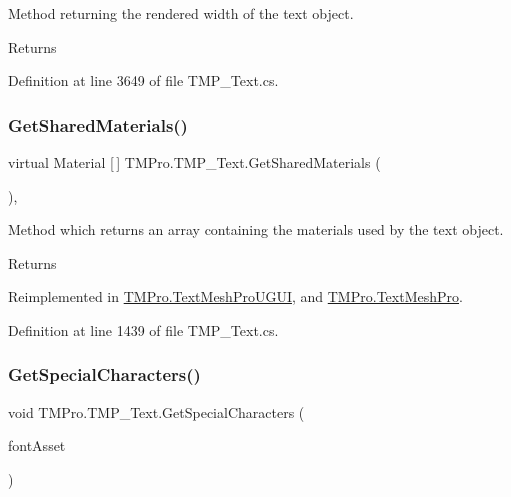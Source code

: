 Method returning the rendered width of the text object. 

\begin{DoxyReturn}{Returns}

\end{DoxyReturn}


Definition at line 3649 of file T\+M\+P\+\_\+\+Text.\+cs.

\mbox{\label{class_t_m_pro_1_1_t_m_p___text_a187cdc5ab36e0006fa0516f208a3cffd}} 
\subsubsection{\texorpdfstring{GetSharedMaterials()}{GetSharedMaterials()}}
{\footnotesize\ttfamily virtual Material \mbox{[}$\,$\mbox{]} T\+M\+Pro.\+T\+M\+P\+\_\+\+Text.\+Get\+Shared\+Materials (\begin{DoxyParamCaption}{ }\end{DoxyParamCaption})\hspace{0.3cm}{\ttfamily [protected]}, {\ttfamily [virtual]}}



Method which returns an array containing the materials used by the text object. 

\begin{DoxyReturn}{Returns}

\end{DoxyReturn}


Reimplemented in \mbox{\hyperlink{class_t_m_pro_1_1_text_mesh_pro_u_g_u_i_aba51a324293336a99b22e4ef5d380660}{T\+M\+Pro.\+Text\+Mesh\+Pro\+U\+G\+UI}}, and \mbox{\hyperlink{class_t_m_pro_1_1_text_mesh_pro_a08e4fa8600f07af3394efbfdc332ecae}{T\+M\+Pro.\+Text\+Mesh\+Pro}}.



Definition at line 1439 of file T\+M\+P\+\_\+\+Text.\+cs.

\mbox{\label{class_t_m_pro_1_1_t_m_p___text_a17ad19c4cf9c5ad4485b208eb0a37bf2}} 
\subsubsection{\texorpdfstring{GetSpecialCharacters()}{GetSpecialCharacters()}}
{\footnotesize\ttfamily void T\+M\+Pro.\+T\+M\+P\+\_\+\+Text.\+Get\+Special\+Characters (\begin{DoxyParamCaption}\item[{\mbox{\hyperlink{class_t_m_pro_1_1_t_m_p___font_asset}{T\+M\+P\+\_\+\+Font\+Asset}}}]{font\+Asset }\end{DoxyParamCaption})\hspace{0.3cm}{\ttfamily [protected]}}



